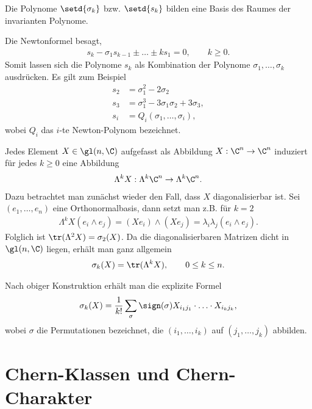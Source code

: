 \documentclass[%
	paper=a5,%
	fleqn,%
	DIV=18,%
	BCOR=0mm,
	fontsize=11pt,
	titlepage=false,%
	bibliography=totoc,
	DIV=18,%
	twoside=true,
	pdftitle=Riemannsche Geometrie,
	pdfauthor=Uwe Semmelmann,
	numbers=noendperiod]%
	{scrbook}
\begin{document}
\begin{rem}[Bemerkungen.]
\begin{remenum}
\item Die Polynome $\setd{\sigma_k}$ bzw. $\setd{s_k}$ bilden eine Basis des
Raumes der invarianten Polynome.
\item Die Newtonformel besagt,
\begin{align*}
s_k - \sigma_1 s_{k-1} \pm \ldots \pm k s_1 = 0,\qquad k\ge 0.
\end{align*}
Somit lassen sich die Polynome $s_k$ als Kombination der Polynome
$\sigma_1,\ldots,\sigma_k$ ausdrücken. Es gilt zum Beispiel
\begin{align*}
s_2 &= \sigma_1^2 - 2\sigma_2\\
s_3 &= \sigma_1^3 - 3\sigma_1\sigma_2 + 3\sigma_3,\\
s_i &= Q_i(\sigma_1,\ldots,\sigma_i),
\end{align*}
wobei $Q_i$ das $i$-te Newton-Polynom bezeichnet.
\item Jedes Element $X\in\gl(n,\C)$ aufgefasst als Abbildung $X: \C^n\to \C^n$
induziert für jedes $k\ge 0$ eine Abbildung
\begin{align*}
\Lambda^k X : \Lambda^k \C^n\to \Lambda^k \C^n.
\end{align*}
Dazu betrachtet man zunächst wieder den Fall, dass $X$ diagonalisierbar ist. Sei
$(e_1,\ldots,e_n)$ eine Orthonormalbasis, dann setzt man z.B. für $k=2$
\begin{align*}
\Lambda^kX(e_i\wedge e_j) = (Xe_i) \wedge (Xe_j) = \lambda_i \lambda_j
(e_i\wedge e_j).
\end{align*}
Folglich ist  $\tr(\Lambda^2 X) = \sigma_2(X)$. Da die diagonalisierbaren
Matrizen dicht in $\gl(n,\C)$ liegen, erhält man ganz allgemein
\begin{align*}
\sigma_k(X) = \tr(\Lambda^k X),\qquad 0 \le k \le n.
\end{align*}
\item Nach obiger Konstruktion erhält man die explizite Formel
\begin{align*}
\sigma_k(X) = \frac{1}{k!} \sum_{\sigma} \sign(\sigma) X_{i_1 j_1}\cdot \ldots
\cdot X_{i_k j_k},
\end{align*}
wobei $\sigma$ die Permutationen bezeichnet, die $(i_1,\ldots,i_k)$ auf
$(j_1,\ldots,j_k)$ abbilden.~\map
\end{remenum}
\end{rem}

\section{Chern-Klassen und Chern-Charakter}
\end{document}
